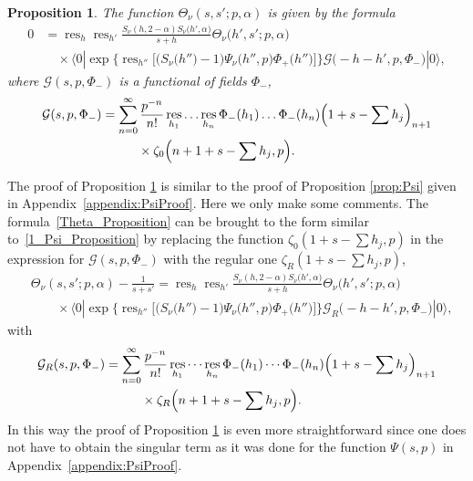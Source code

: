 \documentclass[pdftex]{sigma}
\numberwithin{equation}{section}
\newtheorem{Proposition}[Theorem]{Proposition}
 { \theoremstyle{definition}
\newtheorem{Definition}[Theorem]{Definition}
\newtheorem{Remark}[Theorem]{Remark} }
\DeclareMathOperator{\res}{res}
\begin{document}
\begin{Proposition}
\label{prop:2}
The function $\Theta_\nu(s, s'; p, \alpha)$ is given by the formula
\begin{align}
0&{}=\res_h \res_{h'} \frac{S_{\nu}(h, 2-\alpha) S_\nu\bigl(h', \alpha\bigr)}{s+h} \Theta_\nu\bigl(h', s'; p, \alpha\bigr)\nonumber \\
&\quad{}\times \langle 0| \exp\bigl\{\res_{h''}\bigl[\bigl(S_\nu\bigl(h''\bigr)-1\bigr)\Psi_\nu\bigl(h'', p\bigr)\Phi_{+}\bigl(h''\bigr)\bigr] \bigr\} \mathcal{G}\bigl(-h-h', p, \Phi_-\bigr) |0\rangle, \label{Theta_Proposition}
\end{align}
where $\mathcal{G}(s, p, \Phi_-)$ is a functional of fields $\Phi_{-}$,
\begin{align*}
&\mathcal{G}(s, p, \Phi_-)=
 \sum_{n=0}^{\infty}\frac{p^{-n}}{n!}
                    \res_{h_1}\dots\res_{h_n} \Phi_-(h_1)\dots\Phi_-(h_n)
                    \Bigl(1+s-\sum h_j\Bigr)_{n+1} \\
&\hphantom{\mathcal{G}(s, p, \Phi_-)=\sum_{n=0}^{\infty}}{}
\times\zeta_0\Bigl(n+1+s-\sum h_j, p\Bigr).
\end{align*}
\end{Proposition}

The proof of Proposition \ref{prop:2} is similar to the proof of Proposition \ref{prop:Psi} given in Appendix~\ref{appendix:PsiProof}. Here we only make some comments. The formula~\eqref{Theta_Proposition} can be brought to the form similar to~\eqref{1_Psi_Proposition} by replacing the function $\zeta_0(1+s-\sum h_j, p)$ in the expression for $\mathcal{G}(s, p, \Phi_-)$ with the regular one $\zeta_R(1+s-\sum h_j, p)$,
\begin{align*}
&\Theta_\nu(s, s'; p, \alpha) - \frac{1}{s+s'} = \res_h \res_{h'} \frac{S_{\nu}(h, 2-\alpha) S_\nu\bigl(h', \alpha\bigr)}{s+h} \Theta_\nu\bigl(h', s'; p, \alpha\bigr) \\
&\qquad{}\times\langle 0| \exp\bigl\{\res_{h''}\bigl[\bigl(S_\nu\bigl(h''\bigr)-1\bigr)\Psi_\nu\bigl(h'', p\bigr)\Phi_{+}\bigl(h''\bigr)\bigr] \bigr\} \mathcal{G}_R\bigl(-h-h', p, \Phi_-\bigr) |0\rangle \nonumber,
\end{align*}
with
\begin{align*}
\begin{split}
&\mathcal{G}_R(s, p, \Phi_-)=
 \sum_{n=0}^{\infty}\frac{p^{-n}}{n!}
                    \res_{h_1}\cdots\res_{h_n} \Phi_-(h_1)\cdots\Phi_-(h_n)
                    \Bigl(1+s-\sum h_j\Bigr)_{n+1} \\
&\hphantom{\mathcal{G}_R(s, p, \Phi_-)=\sum_{n=0}^{\infty}}{}
\times\zeta_R\Bigl(n+1+s-\sum h_j, p\Bigr).
\end{split}
\end{align*}
In this way the proof of Proposition \ref{prop:2} is even more straightforward since one does not have to obtain the singular term as it was done for the function $\Psi(s, p)$ in Appendix~\ref{appendix:PsiProof}.
\end{document}
